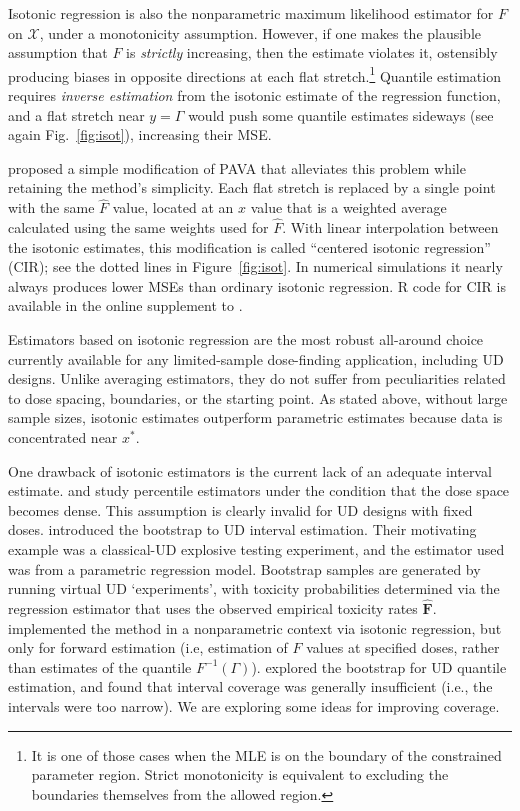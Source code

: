  Isotonic regression is also the nonparametric maximum likelihood estimator for $F$ on $\mathcal{X}$, under a monotonicity assumption. However, if one makes the plausible assumption that $F$ is \emph{strictly} increasing, then the estimate violates it, ostensibly producing biases in opposite directions at each flat stretch.\footnote{It is one of those cases when the MLE is on the boundary of the constrained parameter region. Strict monotonicity is equivalent to excluding the boundaries themselves from the allowed region.} Quantile estimation requires \emph{inverse estimation} from the isotonic estimate of the regression function, and a flat stretch near $y=\Gamma$ would push some quantile estimates sideways (see again Fig.~\ref{fig:isot}), increasing their MSE.

 \cite{Oron07} proposed a simple modification of PAVA that alleviates this problem while retaining the method's simplicity. Each flat stretch is replaced by a single point with the same $\hat{F}$ value, located at an $x$ value that is a weighted average calculated using the same weights used for $\hat{F}$. With linear interpolation between the isotonic estimates, this modification is called ``centered isotonic regression'' (CIR); see the dotted lines in Figure~\ref{fig:isot}. In numerical simulations it nearly always produces lower MSEs than ordinary isotonic regression. R code for CIR is available in the online supplement to \cite{Oron:Hoff:smal:2013}.

Estimators based on isotonic regression are the most robust all-around choice currently available for any limited-sample dose-finding application, including UD designs. Unlike averaging estimators, they do not suffer from peculiarities related to dose spacing, boundaries, or the starting point. As stated above, without large sample sizes, isotonic estimates outperform parametric estimates because  data is concentrated near $x^*$.

One  drawback of isotonic estimators is the current lack of an adequate interval estimate.  \cite{Wright:1984} and \cite{Muke:1993} study percentile estimators under the condition that the dose space becomes dense.  This assumption is clearly invalid for UD designs with fixed doses.  \cite{Chao:Fuh:boot:2001} introduced the bootstrap to UD interval estimation. Their motivating example was a classical-UD explosive testing experiment, and the estimator used was from a parametric regression model. Bootstrap samples are generated by running virtual UD `experiments', with toxicity probabilities determined via the regression estimator that uses the observed empirical toxicity rates $\mathbf{\hat{F}}$.  \cite{Styl:Pros:Flou:esti:2003} implemented the method in a nonparametric context via isotonic regression, but only for forward estimation (i.e, estimation of $F$ values at specified doses, rather than estimates of the quantile $F^{-1}(\Gamma)$). \cite{Oron07} explored the bootstrap for UD quantile estimation, and found that interval coverage was generally insufficient (i.e., the intervals were too narrow). We are exploring some ideas for improving coverage.






